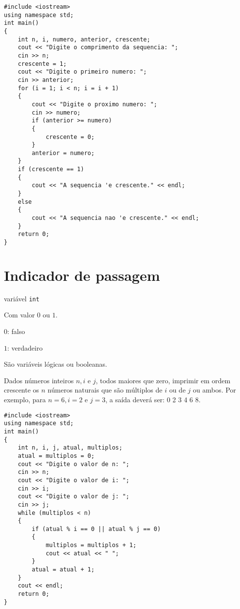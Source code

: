 \documentclass[a4paper]{memoir}
\begin{document}
\begin{sol}
\begin{lstlisting}
#include <iostream>
using namespace std;
int main()
{
    int n, i, numero, anterior, crescente;
    cout << "Digite o comprimento da sequencia: ";
    cin >> n;
    crescente = 1;
    cout << "Digite o primeiro numero: ";
    cin >> anterior;
    for (i = 1; i < n; i = i + 1)
    {
        cout << "Digite o proximo numero: ";
        cin >> numero;
        if (anterior >= numero)
        {
            crescente = 0;
        }
        anterior = numero;
    }
    if (crescente == 1)
    {
        cout << "A sequencia 'e crescente." << endl;
    }
    else
    {
        cout << "A sequencia nao 'e crescente." << endl;
    }
    return 0;
}
\end{lstlisting}
\end{sol}

\section{Indicador de passagem}

variável \verb|int|

Com valor $0$ ou $1$.

$0$: falso

$1$: verdadeiro

São variáveis lógicas ou booleanas.

\begin{prob}\label{prob110.cpp}
Dados números inteiros $n, i$ e $j$, todos maiores que zero, imprimir em ordem crescente os $n$ números naturais que são múltiplos de $i$ ou de $j$ ou ambos. Por exemplo, para $n = 6, i = 2$ e $j = 3$, a saída deverá ser: 0 2 3 4 6 8.
\end{prob}

\begin{sol}
\begin{lstlisting}
#include <iostream>
using namespace std;
int main()
{
    int n, i, j, atual, multiplos;
    atual = multiplos = 0;
    cout << "Digite o valor de n: ";
    cin >> n;
    cout << "Digite o valor de i: ";
    cin >> i;
    cout << "Digite o valor de j: ";
    cin >> j;
    while (multiplos < n)
    {
        if (atual % i == 0 || atual % j == 0)
        {
            multiplos = multiplos + 1;
            cout << atual << " ";
        }
        atual = atual + 1;
    }
    cout << endl;
    return 0;
}
\end{lstlisting}
\end{sol}
\end{document}
